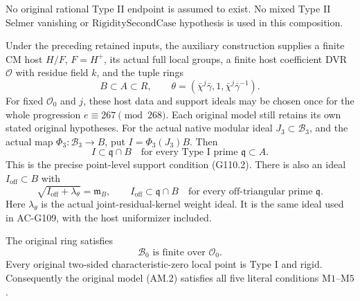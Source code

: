 No original rational Type II endpoint is assumed to exist.
No mixed Type II Selmer vanishing or
\(\mathrm{RigiditySecondCase}\) hypothesis is used in this
composition.

\begin{theorem}
\label{AC-G123-actual-model}
Under the preceding retained inputs, the auxiliary construction
supplies a finite CM host \(H/F\), \(F=H^+\), its actual full local
groups, a finite host coefficient DVR \(\mathcal O\) with residue
field \(k\), and the tuple rings
\[
 B\subset A\subset R,\qquad
 \theta=(\bar\chi^j\bar\gamma,1,\bar\chi^j\bar\gamma^{-1}).
 \tag{AM.4}
\]
For fixed \(\mathcal O_0\) and \(j\), these host data and
support ideals may be chosen once for the whole progression
\(e\equiv267\pmod {268}\).  Each original model still retains
its own stated original hypotheses.
For the actual native modular ideal
\(J_3\subset\mathcal B_3\), and the actual map
\(\Phi_3:\mathcal B_3\to B\), put \(I=\Phi_3(J_3)B\).
Then
\[
 I\subset\mathfrak q\cap B
       \quad\text{for every Type I prime }\mathfrak q\subset A.
 \tag{AM.5}
\]
This is the precise point-level support condition (G110.2).
There is also an ideal \(I_{\mathrm{off}}\subset B\) with
\[
 \sqrt{I_{\mathrm{off}}+\lambda_\theta}=\mathfrak m_B,\qquad
 I_{\mathrm{off}}\subset\mathfrak q\cap B
       \quad\text{for every off-triangular prime }\mathfrak q.
 \tag{AM.6}
\]
Here \(\lambda_\theta\) is the actual joint-residual-kernel
weight ideal.  It is the same ideal used in AC-G109, with
the host uniformizer included.

The original ring satisfies
\[
                   \mathscr B_0
          \text{ is finite over }\mathcal O_0.
 \tag{AM.7}
\]
Every original two-sided characteristic-zero local point is
Type I and rigid.  Consequently the original model (AM.2)
satisfies all five literal conditions \(\mathrm{M1}\)--\(\mathrm{M5}\).


\end{theorem}
